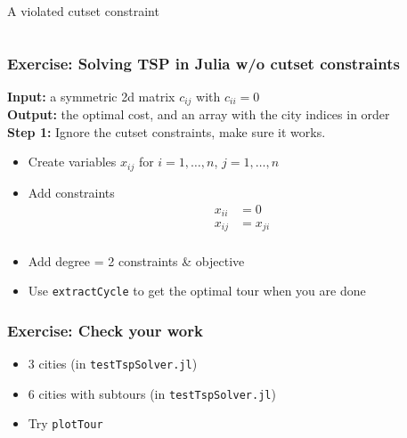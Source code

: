 \documentclass{beamer}
\begin{document}
\begin{frame}
\begin{columns}
\begin{column}{.6\linewidth}
\begin{tiny}
    \end{tiny}
    A violated cutset constraint
    \end{column}
  \end{columns}
\end{frame}

\begin{frame}
  \frametitle{Exercise: Solving TSP in Julia w/o cutset constraints}
  {\bf Input:} a symmetric 2d matrix $c_{ij}$ with $c_{ii} = 0$\\
  {\bf Output:} the optimal cost, and an array with the city indices in order\\
  {\bf Step 1:} Ignore the cutset constraints, make sure it works.
  \begin{itemize}
  \item Create variables $x_{ij}$ for $i = 1,\ldots,n$, $j = 1,\ldots,n$
  \item Add constraints
    \begin{align*}
      x_{ii} &= 0\\
      x_{ij} &= x_{ji}\\
    \end{align*}
  \item Add degree = 2 constraints \& objective
  \item Use {\tt extractCycle} to get the optimal tour when you are done
  \end{itemize}
\end{frame}
\begin{frame}
  \frametitle{Exercise: Check your work}
  \begin{itemize}
  \item 3 cities (in {\tt testTspSolver.jl})
  \item 6 cities with subtours (in {\tt testTspSolver.jl})
  \item Try {\tt plotTour}
  \end{itemize}
\end{frame}
\end{document}
